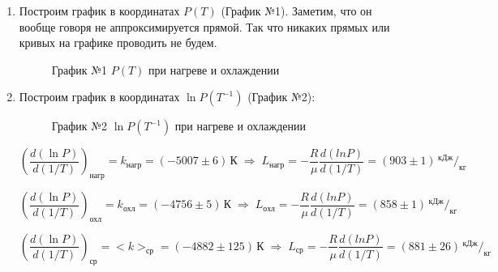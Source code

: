 \documentclass[a4paper,12pt]{article}
\begin{document}
\begin{enumerate}
		\newpage 
		
		\item Построим график в координатах $P(T)$ (График №1).
		Заметим, что он вообще говоря не аппроксимируется прямой. Так что никаких прямых или кривых на графике проводить не будем.
		
		\begin{figure}[h!]
			\caption[]{\label{fig:2} График №1 $P(T)$ при нагреве и охлаждении}
		\end{figure}
	
		\newpage
		 
		\item Построим график в координатах $\ln P(T^{-1})$ (График №2):
		
		\begin{figure}[h!]
			\caption[]{\label{fig:3} График №2 $\ln P(T^{-1})$ при нагреве и охлаждении}
		\end{figure}
	
		$$\left(\dfrac{d(\ln P)}{d(1/T)}\right)_{нагр} = k_{нагр} = (-5007 \pm 6)\,К  \; \Rightarrow \; L_{нагр} = -\dfrac{R}{\mu} \dfrac{d(ln P)}{d(1/T)} = (903 \pm 1)\, ^{кДж}/_{кг}$$
		
		$$\left(\dfrac{d(\ln P)}{d(1/T)}\right)_{охл} = k_{охл} = (-4756 \pm  5)\, К \; \Rightarrow \; L_{охл} = -\dfrac{R}{\mu} \dfrac{d(ln P)}{d(1/T)} = (858 \pm 1)\, ^{кДж}/_{кг}$$
		
		$$\left(\dfrac{d(\ln P)}{d(1/T)}\right)_{ср} =<k>_{ср} = (-4882 \pm  125)\, К \; \Rightarrow \; L_{ср} = -\dfrac{R}{\mu} \dfrac{d(ln P)}{d(1/T)} = (881 \pm 26)\, ^{кДж}/_{кг}$$


\end{enumerate}
\end{document}
